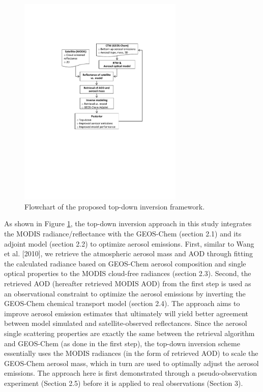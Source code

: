  \begin{figure}[ht]
  \centering
  \includegraphics[width={0.7\textwidth}]{figures/a1.pdf}
  \caption{Flowchart of the proposed top-down inversion framework.}
  \label{fig:flowchat}
 \end{figure}

 As shown in Figure \ref{fig:flowchat}, the top-down inversion approach in this study 
 integrates the MODIS radiance/reflectance with the GEOS-Chem (section 2.1) 
 and its adjoint model (section 2.2) to optimize aerosol emissions. 
 First, similar to Wang et al. [2010], we retrieve the atmospheric 
 aerosol mass and AOD through fitting the calculated radiance based on 
 GEOS-Chem aerosol composition and single optical properties to the MODIS 
 cloud-free radiances (section 2.3). Second, the retrieved AOD 
 (hereafter retrieved MODIS AOD) from the first step is used as 
 an observational constraint to optimize the aerosol emissions 
 by inverting the GEOS-Chem chemical transport model (section 2.4). 
 The approach aims to improve aerosol emission estimates that ultimately 
 will yield better agreement between model simulated and satellite-observed 
 reflectances.  Since the aerosol single scattering properties are 
 exactly the same between the retrieval algorithm and GEOS-Chem 
 (as done in the first step), the top-down inversion scheme essentially 
 uses the MODIS radiances (in the form of retrieved AOD) to scale the 
 GEOS-Chem aerosol mass, which in turn are used to optimally adjust 
 the aerosol emissions. The approach here is first demonstrated through 
 a pseudo-observation experiment (Section 2.5) before it is applied 
 to real observations (Section 3).

